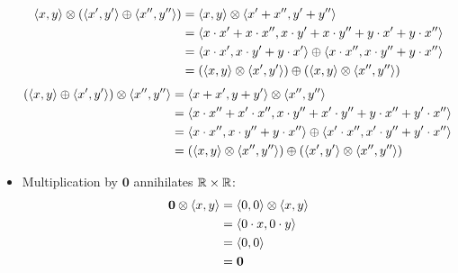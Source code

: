 \documentclass[a4paper,12pt]{ETHexercise}
\begin{document}
\begin{question}
\begin{subquestion}
\begin{itemize}
			      \begin{align}
				      {\langle x , y \rangle} \otimes \left({\langle x' , y' \rangle} \oplus {\langle x'' , y'' \rangle}\right) & = {\langle x , y \rangle} \otimes {\langle x' + x'' , y' + y'' \rangle}                                                          \\
				                                                                            & = {\langle x \cdot x' + x \cdot x'' , x \cdot y' + x \cdot y'' + y \cdot x' + y \cdot x'' \rangle}                   \\
				                                                                            & = {\langle x \cdot x' , x \cdot y' + y \cdot x' \rangle} \oplus {\langle x \cdot x'' , x \cdot y'' + y \cdot x'' \rangle}        \\
				                                                                            & = \left({\langle x , y \rangle} \otimes {\langle x' , y' \rangle}\right) \oplus \left({\langle x , y \rangle} \otimes {\langle x'' , y'' \rangle}\right)
			      \end{align}
			      \begin{align}
				      \left({\langle x , y \rangle} \oplus {\langle x' , y' \rangle}\right) \otimes {\langle x'' , y'' \rangle} & = {\langle x + x' , y + y' \rangle} \otimes {\langle x'' , y'' \rangle}                                                              \\
				                                                                            & = {\langle x \cdot x'' + x' \cdot x'' , x \cdot y'' + x' \cdot y'' + y \cdot x'' + y' \cdot x'' \rangle}                 \\
				                                                                            & = {\langle x \cdot x'' , x \cdot y'' + y \cdot x'' \rangle} \oplus {\langle x' \cdot x'' , x' \cdot y'' + y' \cdot x'' \rangle}      \\
				                                                                            & = \left({\langle x , y \rangle} \otimes {\langle x'' , y'' \rangle}\right) \oplus \left({\langle x' , y' \rangle} \otimes {\langle x'' , y'' \rangle}\right)
			      \end{align}
			\item Multiplication by $\mathbf{0}$ annihilates $\mathbb{R} \times \mathbb{R}$:
			      \begin{align}
				      \mathbf{0} \otimes \pair{x}{y} & = \pair{0}{0} \otimes \pair{x}{y}       \\
				                                     & = \pair{0 \cdot x}{0 \cdot y}           \\
				                                     & = \pair{0}{0}                           \\    &= \mathbf{0}         \\

\end{align}
\end{itemize}
\end{subquestion}
\end{question}
\end{document}
